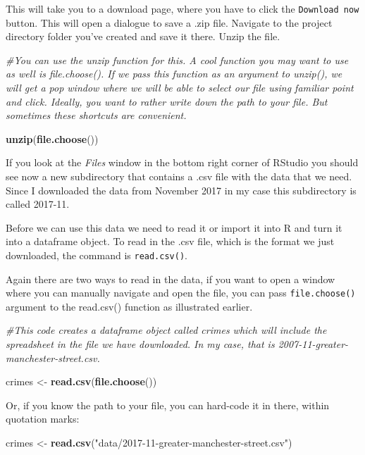 \documentclass[]{book}
\newenvironment{Shaded}{\begin{snugshade}}{\end{snugshade}}
\newcommand{\CommentTok}[1]{\textcolor[rgb]{0.56,0.35,0.01}{\textit{#1}}}
\newcommand{\KeywordTok}[1]{\textcolor[rgb]{0.13,0.29,0.53}{\textbf{#1}}}
\newcommand{\NormalTok}[1]{#1}
\newcommand{\StringTok}[1]{\textcolor[rgb]{0.31,0.60,0.02}{#1}}
\begin{document}
This will take you to a download page, where you have to click the \texttt{Download\ now} button. This will open a dialogue to save a .zip file. Navigate to the project directory folder you've created and save it there. Unzip the file.

\begin{Shaded}
\begin{Highlighting}[]
\CommentTok{#You can use the unzip function for this. A cool function you may want to use as well is file.choose(). If we pass this function as an argument to unzip(), we will get a pop window where we will be able to select our file using familiar point and click. Ideally, you want to rather write down the path to your file. But sometimes these shortcuts are convenient.}

\KeywordTok{unzip}\NormalTok{(}\KeywordTok{file.choose}\NormalTok{())}
\end{Highlighting}
\end{Shaded}

If you look at the \emph{Files} window in the bottom right corner of RStudio you should see now a new subdirectory that contains a .csv file with the data that we need. Since I downloaded the data from November 2017 in my case this subdirectory is called 2017-11.

Before we can use this data we need to read it or import it into R and turn it into a dataframe object. To read in the .csv file, which is the format we just downloaded, the command is \texttt{read.csv()}.

Again there are two ways to read in the data, if you want to open a window where you can manually navigate and open the file, you can pass \texttt{file.choose()} argument to the read.csv() function as illustrated earlier.

\begin{Shaded}
\begin{Highlighting}[]
\CommentTok{#This code creates a dataframe object called crimes which will include the spreadsheet in the file we have downloaded. In my case, that is 2007-11-greater-manchester-street.csv.}

\NormalTok{crimes <-}\StringTok{ }\KeywordTok{read.csv}\NormalTok{(}\KeywordTok{file.choose}\NormalTok{())}
\end{Highlighting}
\end{Shaded}

Or, if you know the path to your file, you can hard-code it in there, within quotation marks:

\begin{Shaded}
\begin{Highlighting}[]
\NormalTok{crimes <-}\StringTok{ }\KeywordTok{read.csv}\NormalTok{(}\StringTok{"data/2017-11-greater-manchester-street.csv"}\NormalTok{)}
\end{Highlighting}
\end{Shaded}
\end{document}
